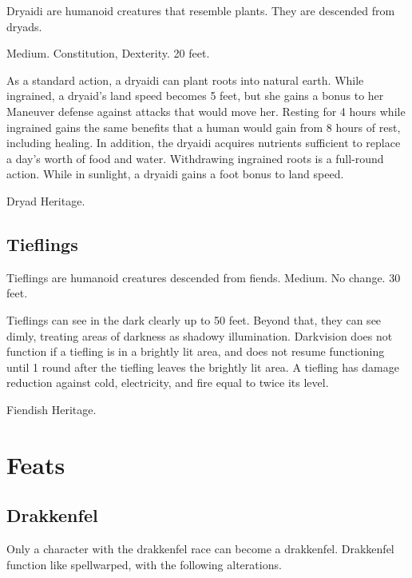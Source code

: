 Dryaidi are humanoid creatures that resemble plants. They are descended from dryads.

 Medium.
  Constitution,  Dexterity.
 20 feet.
\begin{itemize}
     As a standard action, a dryaidi can plant roots into natural earth. While ingrained, a dryaid's land speed becomes 5 feet, but she gains a  bonus to her Maneuver defense against attacks that would move her. Resting for 4 hours while ingrained gains the same benefits that a human would gain from 8 hours of rest, including healing. In addition, the dryaidi acquires nutrients sufficient to replace a day's worth of food and water. Withdrawing ingrained roots is a full-round action.
     While in sunlight, a dryaidi gains a  foot bonus to land speed.
\end{itemize}
 Dryad Heritage.

\subsection{Tieflings}

Tieflings are humanoid creatures descended from fiends.
 Medium.
 No change.
 30 feet.
\begin{itemize}
     Tieflings can see in the dark clearly up to 50 feet. Beyond that, they can see dimly, treating areas of darkness as shadowy illumination. Darkvision does not function if a tiefling is in a brightly lit area, and does not resume functioning until 1 round after the tiefling leaves the brightly lit area.
     A tiefling has damage reduction against cold, electricity, and fire equal to twice its level.
\end{itemize}
 Fiendish Heritage.

\section{Feats}

\subsection{Drakkenfel}

Only a character with the drakkenfel race can become a drakkenfel. Drakkenfel function like spellwarped, with the following alterations.

